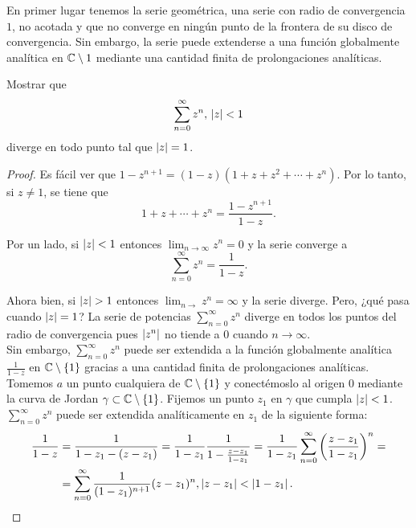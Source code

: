 En primer lugar tenemos la serie geométrica, una serie con radio de convergencia $1$, no acotada y que no converge en ningún punto de la frontera de su disco de convergencia. Sin embargo, la serie puede extenderse a una función globalmente analítica en $\mathbb{C} \setminus{1}$ mediante una cantidad finita de prolongaciones analíticas. \\


\begin{example}
    Mostrar que
    \begin{equation*}
        \sum_{n=0}^{\infty} z^n, \, \left\lvert z\right\rvert < 1
    \end{equation*}
    diverge en todo punto tal que $\left\lvert z\right\rvert = 1$.
\end{example}

\begin{proof}
Es fácil ver que $1 - z^{n+1} = (1 - z) (1+ z + z^2 + \cdots + z^n)$. Por lo tanto, si $z \neq 1$, se tiene que
\begin{equation}
    1 + z + \cdots + z^n = \frac{1 - z^{n+1}}{1-z}.
\end{equation}

Por un lado, si $\left\lvert z\right\rvert < 1$ entonces $\lim_{n \to \infty} z^n = 0$ y la serie converge a
\begin{equation*}
    \sum_{n=0}^{\infty} z^n = \frac{1}{1 - z}.
\end{equation*}

Ahora bien, si $\left\lvert z\right\rvert > 1$ entonces $\lim_{n \to} z^n = \infty$ y la serie diverge. Pero, ¿qué pasa cuando $\left\lvert z\right\rvert = 1$? La serie de potencias $\sum_{n=0}^{\infty} z^n$ diverge en todos los puntos del radio de convergencia pues $\left\lvert z^n\right\rvert$ no tiende a 0 cuando $n \to \infty$. \\

Sin embargo, $\sum_{n=0}^{\infty} z^n$ puede ser extendida a la función globalmente analítica $\frac{1}{1-z}$ en $\mathbb{C} \setminus \{1\}$ gracias a una cantidad finita de prolongaciones analíticas. \\

Tomemos $a$ un punto cualquiera de $\mathbb{C} \setminus \{1\}$ y conectémoslo al origen $0$ mediante la curva de Jordan $\gamma \subset \mathbb{C} \setminus \{1\}$. Fijemos un punto $z_1$ en $\gamma$ que cumpla $\left\lvert z\right\rvert < 1$. $\sum_{n=0}^{\infty} z^n$ puede ser extendida analíticamente en $z_1$ de la siguiente forma:
\begin{equation*}
    \begin{split}
        \frac{1}{1-z} & = \frac{1}{1 - z_1 - (z - z_1)} = \frac{1}{1 - z_1} \frac{1}{1 - \frac{z - z_1}{1 - z_1}} = \frac{1}{1 - z_1} \sum_{n=0}^{\infty} \left(\frac{z - z_1}{1 - z_1} \right)^n = \\
                      & = \sum_{n=0}^{\infty}  \frac{1}{(1 - z_1)^{n+1}} (z - z_1)^n, \left\lvert z - z_1\right\rvert < \left\lvert1 - z_1\right\rvert.
    \end{split}
\end{equation*}


\end{proof}
